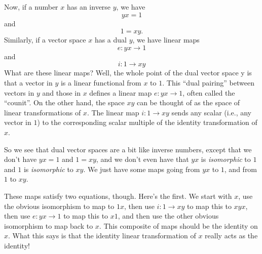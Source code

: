 \documentclass{article}
\begin{document}
Now, if a number \(x\) has an inverse \(y\), we have \[yx = 1\] and
\[1 = xy.\] Similarly, if a vector space \(x\) has a dual \(y\), we have
linear maps \[e\colon yx\to 1\] and \[i\colon 1\to xy\] What are these
linear maps? Well, the whole point of the dual vector space y is that a
vector in \(y\) is a linear functional from \(x\) to \(1\). This ``dual
pairing'' between vectors in \(y\) and those in \(x\) defines a linear
map \(e\colon yx\to 1\), often called the ``counit''. On the other hand,
the space \(xy\) can be thought of as the space of linear
transformations of \(x\). The linear map \(i\colon 1\to xy\) sends any
scalar (i.e., any vector in \(1\)) to the corresponding scalar multiple
of the identity transformation of \(x\).

So we see that dual vector spaces are a bit like inverse numbers, except
that we don't have \(yx = 1\) and \(1 = xy\), and we don't even have
that \(yx\) is \emph{isomorphic} to \(1\) and \(1\) is \emph{isomorphic}
to \(xy\). We just have some maps going from \(yx\) to \(1\), and from
\(1\) to \(xy\).

These maps satisfy two equations, though. Here's the first. We start
with \(x\), use the obvious isomorphism to map to \(1x\), then use
\(i\colon 1\to xy\) to map this to \(xyx\), then use \(e\colon yx\to 1\)
to map this to \(x1\), and then use the other obvious isomorphism to map
back to \(x\). This composite of maps should be the identity on \(x\).
What this says is that the identity linear transformation of \(x\)
really acts as the identity!
\end{document}
